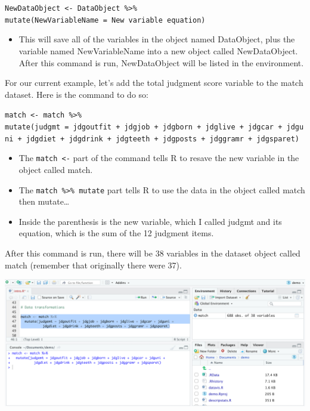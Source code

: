 \documentclass[
]{book}
\providecommand{\tightlist}{%
  \setlength{\itemsep}{0pt}\setlength{\parskip}{0pt}}
\begin{document}
\texttt{NewDataObject\ \textless{}-\ DataObject\ \%\textgreater{}\%}\\
\texttt{mutate(NewVariableName\ =\ New\ variable\ equation)}

\begin{itemize}
\tightlist
\item
  This will save all of the variables in the object named DataObject, plus the variable named NewVariableName into a new object called NewDataObject. After this command is run, NewDataObject will be listed in the environment.
\end{itemize}

For our current example, let's add the total judgment score variable to the match dataset. Here is the command to do so:

\texttt{match\ \textless{}-\ match\ \%\textgreater{}\%}\\
\texttt{mutate(judgmt\ =\ jdgoutfit\ +\ jdgjob\ +\ jdgborn\ +\ jdglive\ +\ jdgcar\ +\ jdguni\ +\ jdgdiet\ +\ jdgdrink\ +\ jdgteeth\ +\ jdgposts\ +\ jdggramr\ +\ jdgsparet)}

\begin{itemize}
\tightlist
\item
  The \texttt{match\ \textless{}-} part of the command tells R to resave the new variable in the object called match.\\
\item
  The \texttt{match\ \%\textgreater{}\%\ mutate} part tells R to use the data in the object called match then mutate\ldots{}\\
\item
  Inside the parenthesis is the new variable, which I called judgmt and its equation, which is the sum of the 12 judgment items.
\end{itemize}

After this command is run, there will be 38 variables in the dataset object called match (remember that originally there were 37).

\includegraphics{img/DATA THINGS R111.png}
\end{document}
